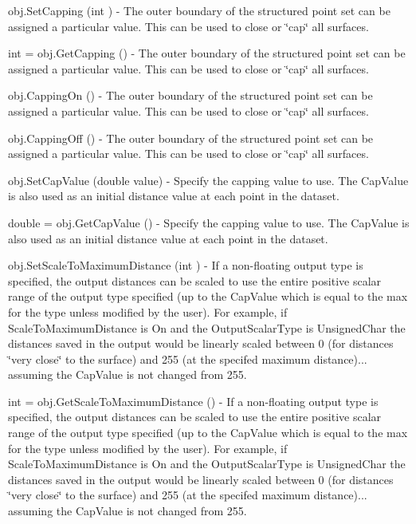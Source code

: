 \begin{DoxyItemize}
\item {\ttfamily obj.\-Set\-Capping (int )} -\/ The outer boundary of the structured point set can be assigned a particular value. This can be used to close or \char`\"{}cap\char`\"{} all surfaces.  
\item {\ttfamily int = obj.\-Get\-Capping ()} -\/ The outer boundary of the structured point set can be assigned a particular value. This can be used to close or \char`\"{}cap\char`\"{} all surfaces.  
\item {\ttfamily obj.\-Capping\-On ()} -\/ The outer boundary of the structured point set can be assigned a particular value. This can be used to close or \char`\"{}cap\char`\"{} all surfaces.  
\item {\ttfamily obj.\-Capping\-Off ()} -\/ The outer boundary of the structured point set can be assigned a particular value. This can be used to close or \char`\"{}cap\char`\"{} all surfaces.  
\item {\ttfamily obj.\-Set\-Cap\-Value (double value)} -\/ Specify the capping value to use. The Cap\-Value is also used as an initial distance value at each point in the dataset.  
\item {\ttfamily double = obj.\-Get\-Cap\-Value ()} -\/ Specify the capping value to use. The Cap\-Value is also used as an initial distance value at each point in the dataset.  
\item {\ttfamily obj.\-Set\-Scale\-To\-Maximum\-Distance (int )} -\/ If a non-\/floating output type is specified, the output distances can be scaled to use the entire positive scalar range of the output type specified (up to the Cap\-Value which is equal to the max for the type unless modified by the user). For example, if Scale\-To\-Maximum\-Distance is On and the Output\-Scalar\-Type is Unsigned\-Char the distances saved in the output would be linearly scaled between 0 (for distances \char`\"{}very close\char`\"{} to the surface) and 255 (at the specifed maximum distance)... assuming the Cap\-Value is not changed from 255.  
\item {\ttfamily int = obj.\-Get\-Scale\-To\-Maximum\-Distance ()} -\/ If a non-\/floating output type is specified, the output distances can be scaled to use the entire positive scalar range of the output type specified (up to the Cap\-Value which is equal to the max for the type unless modified by the user). For example, if Scale\-To\-Maximum\-Distance is On and the Output\-Scalar\-Type is Unsigned\-Char the distances saved in the output would be linearly scaled between 0 (for distances \char`\"{}very close\char`\"{} to the surface) and 255 (at the specifed maximum distance)... assuming the Cap\-Value is not changed from 255.  

\end{DoxyItemize}
